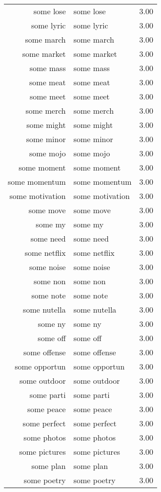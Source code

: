 \begin{table}[ht]
\begin{tabular}{rlr}
  some lose & some lose & 3.00 \\ 
  some lyric & some lyric & 3.00 \\ 
  some march & some march & 3.00 \\ 
  some market & some market & 3.00 \\ 
  some mass & some mass & 3.00 \\ 
  some meat & some meat & 3.00 \\ 
  some meet & some meet & 3.00 \\ 
  some merch & some merch & 3.00 \\ 
  some might & some might & 3.00 \\ 
  some minor & some minor & 3.00 \\ 
  some mojo & some mojo & 3.00 \\ 
  some moment & some moment & 3.00 \\ 
  some momentum & some momentum & 3.00 \\ 
  some motivation & some motivation & 3.00 \\ 
  some move & some move & 3.00 \\ 
  some my & some my & 3.00 \\ 
  some need & some need & 3.00 \\ 
  some netflix & some netflix & 3.00 \\ 
  some noise & some noise & 3.00 \\ 
  some non & some non & 3.00 \\ 
  some note & some note & 3.00 \\ 
  some nutella & some nutella & 3.00 \\ 
  some ny & some ny & 3.00 \\ 
  some off & some off & 3.00 \\ 
  some offense & some offense & 3.00 \\ 
  some opportun & some opportun & 3.00 \\ 
  some outdoor & some outdoor & 3.00 \\ 
  some parti & some parti & 3.00 \\ 
  some peace & some peace & 3.00 \\ 
  some perfect & some perfect & 3.00 \\ 
  some photos & some photos & 3.00 \\ 
  some pictures & some pictures & 3.00 \\ 
  some plan & some plan & 3.00 \\ 
  some poetry & some poetry & 3.00 \\ 

\end{tabular}
\end{table}

